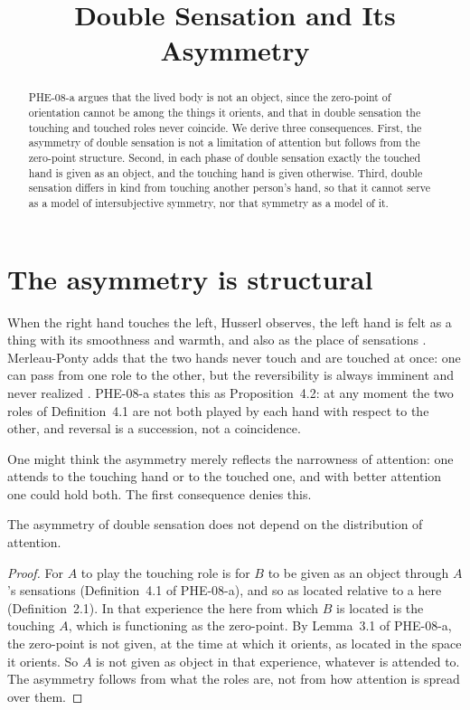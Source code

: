 \documentclass{situationist-preprint}
\title{Double Sensation and Its Asymmetry}
\begin{document}
\maketitle

\begin{abstract}
PHE-08-a argues that the lived body is not an object, since the zero-point of orientation cannot be among the things it orients, and that in double sensation the touching and touched roles never coincide. We derive three consequences. First, the asymmetry of double sensation is not a limitation of attention but follows from the zero-point structure. Second, in each phase of double sensation exactly the touched hand is given as an object, and the touching hand is given otherwise. Third, double sensation differs in kind from touching another person's hand, so that it cannot serve as a model of intersubjective symmetry, nor that symmetry as a model of it.
\end{abstract}

\section{The asymmetry is structural}

When the right hand touches the left, Husserl observes, the left hand is felt as a thing with its smoothness and warmth, and also as the place of sensations \citep{Husserl1952}. Merleau-Ponty adds that the two hands never touch and are touched at once: one can pass from one role to the other, but the reversibility is always imminent and never realized \citep{MerleauPonty1964}. PHE-08-a states this as Proposition~4.2: at any moment the two roles of Definition~4.1 are not both played by each hand with respect to the other, and reversal is a succession, not a coincidence.

One might think the asymmetry merely reflects the narrowness of attention: one attends to the touching hand or to the touched one, and with better attention one could hold both. The first consequence denies this.

\begin{proposition}\label{p:struct}
The asymmetry of double sensation does not depend on the distribution of attention.
\end{proposition}

\begin{proof}
For $A$ to play the touching role is for $B$ to be given as an object through $A$'s sensations (Definition~4.1 of PHE-08-a), and so as located relative to a here (Definition~2.1). In that experience the here from which $B$ is located is the touching $A$, which is functioning as the zero-point. By Lemma~3.1 of PHE-08-a, the zero-point is not given, at the time at which it orients, as located in the space it orients. So $A$ is not given as object in that experience, whatever is attended to. The asymmetry follows from what the roles are, not from how attention is spread over them.
\end{proof}
\end{document}
